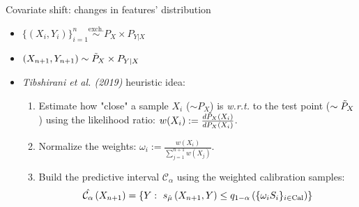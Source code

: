 \documentclass{beamer}
\newcommand{\Ca}{\mathcal{C}_{\alpha}}
\renewcommand{\a}{\alpha}
\begin{document}
\begin{frame}{Covariate shift: changes in features’ distribution}
    \begin{itemize}%
        \item $\{\left(X_i, Y_i\right)\}_{i=1}^n \overset{\mathrm{exch.}}{\sim} P_X\times P_{Y|X}$
        \item $\left(X_{n+1}, Y_{n+1}\right) \sim \Tilde{P}_X\times P_{Y|X}$
        \item \textit{Tibshirani et al. (2019)} %
        heuristic idea:
        \begin{enumerate}  
            \item Estimate how "close" a sample $X_i$ ($\sim P_X$) is \textit{w.r.t.} to the test point ($\sim \Tilde{P}_X$) using the likelihood ratio: $w(X_i):= \frac{d\Tilde{P}_X(X_i)}{dP_X(X_i)}$.
            \item Normalize the weights: $\omega_i:=\frac{w(X_i)}{\sum_{j=1}^{n+1} w(X_j)}$. 
            \item Build the predictive interval $\Ca$ using the weighted calibration samples:
            \begin{equation*}\label{eq:cp-covariate}
                \Hat{\Ca}\left(X_{n+1}\right) = \{ Y: \ s_{\Hat{\mu}}\left(X_{n+1}, Y\right) \leq q_{1-\a}\left(\{\omega_i S_i\}_{i\in\rm{Cal}}\right)  \}
            \end{equation*}
        \end{enumerate}
    \end{itemize}
    
\end{frame}

\end{document}

